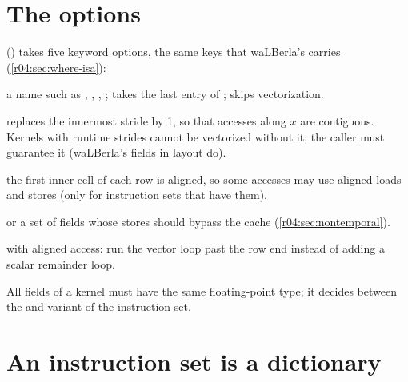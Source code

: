 \section{The options}

 () takes five keyword options, the same
keys that waLBerla's  carries (\cref{r04:sec:where-isa}):
\begin{description}[style=nextline]
  \item[\code{instruction_set}] a name such as , ,
    , ;  takes the last entry of
    ;  skips vectorization.
  \item[\code{assume_inner_stride_one}] replaces the innermost stride by 1, so that
    accesses along $x$ are contiguous. Kernels with runtime strides cannot be vectorized
    without it; the caller must guarantee it (waLBerla's fields in  layout do).
  \item[\code{assume_aligned}] the first inner cell of each row is aligned, so some
    accesses may use aligned loads and stores (only for instruction sets that have them).
  \item[\code{nontemporal}]  or a set of fields whose stores should bypass
    the cache (\cref{r04:sec:nontemporal}).
  \item[\code{assume_sufficient_line_padding}] with aligned access: run the vector loop
    past the row end instead of adding a scalar remainder loop.
\end{description}
All fields of a kernel must have the same floating-point type; it decides between the
 and  variant of the instruction set.

\section{An instruction set is a dictionary}\label{r04:sec:dict}

